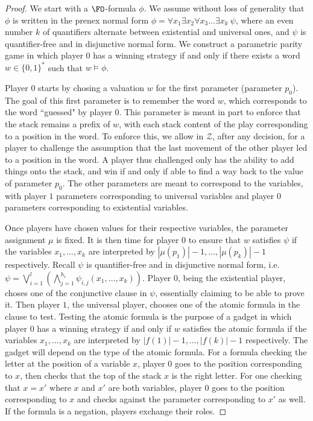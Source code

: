 \documentclass[a4paper,UKenglish,cleveref, autoref, thm-restate]{lipics-v2021}
\begin{document}
\begin{proof}

\noindent
We start with
 a 
 $\FO$-formula $\phi$.
We assume without loss of generality that $\phi$ is written in the prenex normal form
$\phi = \forall x_1 \exists x_2 \forall x_3 \ldots \exists x_k ~ \psi$, where 
an even number $k$ of quantifiers alternate between existential and universal ones, and 
$\psi$ is quantifier-free and in disjunctive normal form.
We construct
a parametric parity game
in which
player $0$ has a winning strategy
if and only if
there exists a word $w \in \{0,1\}^*$ such that
$w  \models \phi $. 





Player $0$ starts by chosing a valuation $w$ for the first parameter (parameter $p_0$). The goal of this first parameter is to remember
the word $w$, which corresponds to the word ``guessed" by player $0$. 
This parameter is meant in part to enforce that 
the stack remains a prefix of $w$, with each stack content of the play corresponding to a position in the word.
 To enforce this, we allow in $\mathcal{Z}$, after any decision, for a player to challenge the assumption that the last movement of the other player led to a position in the word.
  A player thus challenged only has the ability to add things onto the stack, and win if and only if able to find a way back to the value of parameter $p_0$. 
The other parameters are meant to correspond to the variables, with player $1$ parameters corresponding to universal variables and player $0$ parameters corresponding to existential variables.

Once players have chosen values for their respective variables, the parameter assignment
$\mu$ is fixed. It is then time
for player $0$ to ensure that
$w$
satisfies $\psi$ if the variables $x_1, \ldots, x_k$ are interpreted by 
$ |\mu(p_1)|-1, \ldots, |\mu(p_k)|-1$ respectively. 
Recall $\psi$ is quantifier-free and in disjunctive normal form, i.e.
 $ \psi = %
 \bigvee_{i=1}^l(\bigwedge_{j=1}^{h_i} \psi_{i,j}(x_1, \ldots, x_k)).$
Player $0$, being the existential player, choses one of the conjunctive clause in $\psi$, essentially claiming to be able to prove it. Then player $1$, the universal player, chooses one of the atomic formula in the clause to test. 
Testing the atomic formula is the purpose of a gadget 
in which
 player $0$ has a winning strategy 
  if and only if 
$w$ satisfies 
the atomic formula
 if the variables $x_1, \ldots, x_k$ are interpreted by 
$ |f(1)|-1, \ldots, |f(k)|-1$ respectively.
The gadget will depend on the type of the atomic formula. For a formula checking the letter at the position of a variable $x$, player $0$ goes to the position corresponding to $x$, then checks that the top of the stack
$x$ is the right letter. For one checking that $x = x'$ where $x$ and $x'$ are both variables,
player $0$ goes to the position corresponding to $x$ and checks against the parameter corresponding to $x'$ as well. If the formula is a negation, players exchange their roles. 
\end{proof}
\end{document}

